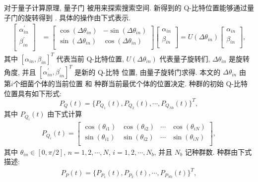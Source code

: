 对于量子计算原理, 量子门 被用来探索搜索空间. 新得到的 Q-比特位置能够通过量子门的旋转得到 . 具体的操作由下式表示.
 \begin{align}
\left [
\begin{array}{c}
\alpha_{in}^{'}\\
\beta_{in}^{'}\\
\end{array}\right]
&=\left [\begin{array}{cc}
\cos(\Delta\theta_{in}) &  -\sin(\Delta\theta_{in}) \\
\sin(\Delta\theta_{in})&  \cos(\Delta\theta_{in}) \\
\end{array}\right]
\left [\begin{array}{c}
\alpha_{in}\\
\beta_{in}\\
\end{array}\right]
=U(\Delta\theta_{in})
\left [\begin{array}{c}
\alpha_{in}\\
\beta_{in}\\
\end{array}\right],\label{rotationgate}
\end{align}
其中 $[\alpha_{in},\beta_{in}]^T$ 代表当前 Q-比特位置, $U(\Delta\theta_{in})$ 代表量子旋转们, $\Delta\theta_{in}$ 是旋转角度, 并且 $[\alpha_{in}^{'}, \beta_{in}^{'}]^T$ 是新的 Q-比特 位置, 由量子旋转门求得.
本文的  $\Delta\theta_{in}$ 由 第$i$个细菌个体的当前位置 和 种群当前最优个体的位置决定.
种群的初始 Q-比特位置具有如下形式:
\begin{equation}
    P_{Q}(t)=\{P_{Q_1}(t), P_{Q_2}(t),\cdots,P_{Q_{Nb}}(t)\}^T,\label{PQt}
\end{equation}
其中 $P_{Q_{i}}(t)$ 由下式计算
\begin{gather}
P_{Q_i}(t)=\left [\begin{array}{cccc}\label{init_Qindividual}
\cos(\theta_{i1}) &  \cos(\theta_{i2})  &  \cdots&  \cos(\theta_{iN})\\
\sin(\theta_{i1})&  \sin(\theta_{i2})&  \cdots &  \sin(\theta_{iN})\\
\end{array}\right],
\end{gather}
其中 $\theta_{in}\in[0,\pi/2]$, $n=1,2, \cdots, N$, $i=1,2,\cdots, N_b$, 并且 $N_b$ 记种群数. 种群由下式描述:
\begin{align}\label{measure_ppi}
    P_{P}(t)= \{P_{P_1}(t), P_{P_2}(t),\cdots,P_{P_{Nb}}(t)\}^T,
\end{align}
